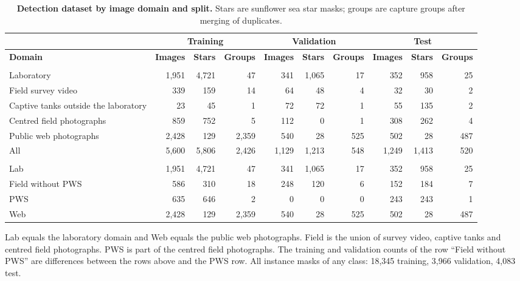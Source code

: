 \begin{table}[!htbp]
\centering
\caption{\textbf{Detection dataset by image domain and split.} Stars are sunflower sea star masks; groups are capture groups after merging of duplicates.}
\label{tab:detdata}
{\footnotesize
\setlength{\tabcolsep}{3.5pt}
\begin{tabular}{|l|r|r|r|r|r|r|r|r|r|}
\hline
 & \multicolumn{3}{c|}{\textbf{Training}} & \multicolumn{3}{c|}{\textbf{Validation}} & \multicolumn{3}{c|}{\textbf{Test}} \\ \hline
\textbf{Domain} & \textbf{Images} & \textbf{Stars} & \textbf{Groups} & \textbf{Images} & \textbf{Stars} & \textbf{Groups} & \textbf{Images} & \textbf{Stars} & \textbf{Groups} \\ \thickhline
\multicolumn{10}{|l|}{\textbf{Five image domains}} \\ \hline
Laboratory & 1,951 & 4,721 & 47 & 341 & 1,065 & 17 & 352 & 958 & 25 \\ \hline
Field survey video & 339 & 159 & 14 & 64 & 48 & 4 & 32 & 30 & 2 \\ \hline
Captive tanks outside the laboratory & 23 & 45 & 1 & 72 & 72 & 1 & 55 & 135 & 2 \\ \hline
Centred field photographs & 859 & 752 & 5 & 112 & 0 & 1 & 308 & 262 & 4 \\ \hline
Public web photographs & 2,428 & 129 & 2,359 & 540 & 28 & 525 & 502 & 28 & 487 \\ \hline
All & 5,600 & 5,806 & 2,426 & 1,129 & 1,213 & 548 & 1,249 & 1,413 & 520 \\ \thickhline
\multicolumn{10}{|l|}{\textbf{Evaluation view}} \\ \hline
Lab & 1,951 & 4,721 & 47 & 341 & 1,065 & 17 & 352 & 958 & 25 \\ \hline
Field without PWS & 586 & 310 & 18 & 248 & 120 & 6 & 152 & 184 & 7 \\ \hline
PWS & 635 & 646 & 2 & 0 & 0 & 0 & 243 & 243 & 1 \\ \hline
Web & 2,428 & 129 & 2,359 & 540 & 28 & 525 & 502 & 28 & 487 \\ \hline
\end{tabular}
}
\begin{flushleft}\small
Lab equals the laboratory domain and Web equals the public web photographs.
Field is the union of survey video, captive tanks and centred field photographs.
PWS is part of the centred field photographs.
The training and validation counts of the row ``Field without PWS'' are differences between the rows above and the PWS row.
All instance masks of any class: 18,345 training, 3,966 validation, 4,083 test.
\end{flushleft}
\end{table}

